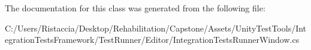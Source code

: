 The documentation for this class was generated from the following file\+:\begin{DoxyCompactItemize}
\item 
C\+:/\+Users/\+Ristaccia/\+Desktop/\+Rehabilitation/\+Capstone/\+Assets/\+Unity\+Test\+Tools/\+Integration\+Tests\+Framework/\+Test\+Runner/\+Editor/Integration\+Tests\+Runner\+Window.\+cs\end{DoxyCompactItemize}
